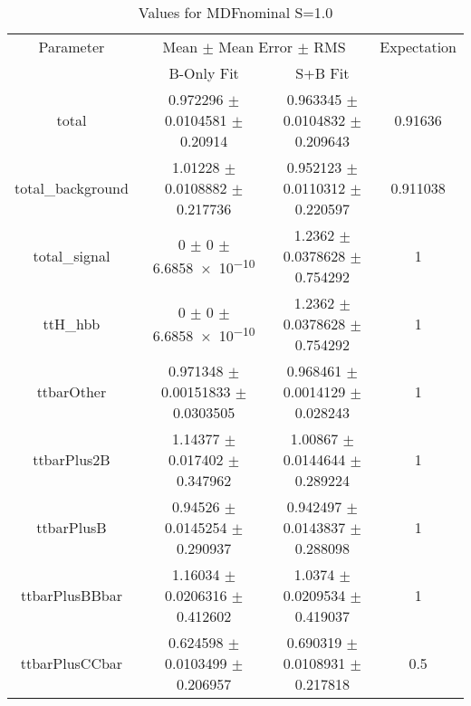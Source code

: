 \begin{table}
\centering
\caption{Values for MDFnominal S=1.0}
\begin{tabular}{cccc}
\toprule
Parameter & \multicolumn{2}{c}{Mean $\pm$ Mean Error $\pm$ RMS} & Expectation\\
 & B-Only Fit & S+B Fit & \\
\midrule
total & \num{0.972296} $\pm$ \num{0.0104581} $\pm$ \num{0.20914} & \num{0.963345} $\pm$ \num{0.0104832} $\pm$ \num{0.209643} & \num{0.91636}\\
total\_background & \num{1.01228} $\pm$ \num{0.0108882} $\pm$ \num{0.217736} & \num{0.952123} $\pm$ \num{0.0110312} $\pm$ \num{0.220597} & \num{0.911038}\\
total\_signal & \num{0} $\pm$ \num{0} $\pm$ \num{6.6858e-10} & \num{1.2362} $\pm$ \num{0.0378628} $\pm$ \num{0.754292} & \num{1}\\
ttH\_hbb & \num{0} $\pm$ \num{0} $\pm$ \num{6.6858e-10} & \num{1.2362} $\pm$ \num{0.0378628} $\pm$ \num{0.754292} & \num{1}\\
ttbarOther & \num{0.971348} $\pm$ \num{0.00151833} $\pm$ \num{0.0303505} & \num{0.968461} $\pm$ \num{0.0014129} $\pm$ \num{0.028243} & \num{1}\\
ttbarPlus2B & \num{1.14377} $\pm$ \num{0.017402} $\pm$ \num{0.347962} & \num{1.00867} $\pm$ \num{0.0144644} $\pm$ \num{0.289224} & \num{1}\\
ttbarPlusB & \num{0.94526} $\pm$ \num{0.0145254} $\pm$ \num{0.290937} & \num{0.942497} $\pm$ \num{0.0143837} $\pm$ \num{0.288098} & \num{1}\\
ttbarPlusBBbar & \num{1.16034} $\pm$ \num{0.0206316} $\pm$ \num{0.412602} & \num{1.0374} $\pm$ \num{0.0209534} $\pm$ \num{0.419037} & \num{1}\\
ttbarPlusCCbar & \num{0.624598} $\pm$ \num{0.0103499} $\pm$ \num{0.206957} & \num{0.690319} $\pm$ \num{0.0108931} $\pm$ \num{0.217818} & \num{0.5}\\
\bottomrule
\end{tabular}
\end{table}